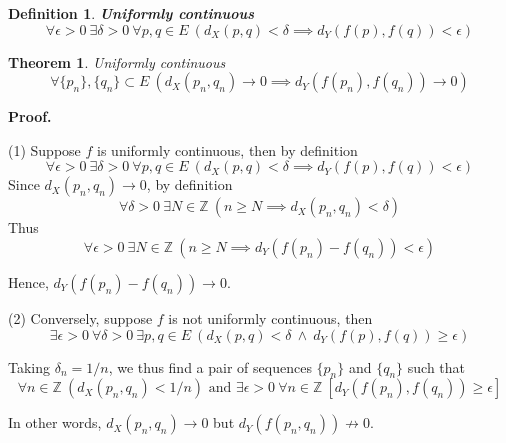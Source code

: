 \documentclass[aps,pra,onecolumn,notitlepage,superscriptaddress]{revtex4-1}
\newcommand{\Z}{\mathbb{Z}}
\newtheorem{theo}{Theorem}
\newtheorem{defi}{Definition}
\def\Proof{{\bf Proof.~}}
\begin{document}
    \begin{defi}
        \textbf{Uniformly continuous}
        \begin{equation}
            \forall \epsilon > 0 \ \exists \delta > 0 \ \forall p,q \in E \ \left(d_X(p,q) < \delta \implies d_Y(f(p),f(q)) < \epsilon \right)
        \end{equation}
    \end{defi}
    \begin{theo}
        Uniformly continuous
        \begin{equation}
            \forall \{p_n\}, \{q_n\} \subset E \ \left(d_X(p_n, q_n) \to 0 \implies d_Y(f(p_n), f(q_n)) \to 0 \right)
        \end{equation}
    \end{theo}
    \begin{framed}
        \Proof {
            
            (1) Suppose $f$ is uniformly continuous, then by definition
            \begin{equation}
                \forall \epsilon > 0 \ \exists \delta > 0 \ \forall p,q \in E \ \left(d_X(p,q) < \delta \implies d_Y(f(p),f(q)) < \epsilon \right)
            \end{equation}
            Since $d_X(p_n, q_n) \to 0$, by definition
            \begin{equation}
                \forall \delta > 0 \ \exists N \in \Z \ \left( n \geq N \implies d_X(p_n, q_n) < \delta \right)
            \end{equation}
            Thus
            \begin{equation}
                \forall \epsilon > 0 \ \exists N \in \Z \ \left( n \geq N \implies d_Y(f(p_n) - f(q_n)) < \epsilon \right)
            \end{equation}
    
            Hence, $d_Y(f(p_n) - f(q_n)) \to 0$.

            (2) Conversely, suppose $f$ is not uniformly continuous, then
            \begin{equation}
                \exists \epsilon > 0 \ \forall \delta > 0 \ \exists p,q\in E \ \left( d_X(p,q) < \delta \ \land \ d_Y(f(p),f(q)) \geq \epsilon \right) 
            \end{equation}
            
            Taking $\delta_n = 1/n$, we thus find a pair of sequences $\{p_n\}$ and $\{q_n\}$ such that
            \begin{equation}
                \forall n \in \Z \ (d_X(p_n, q_n) < 1/n) \text{ and } \exists \epsilon > 0 \ \forall n \in \Z \ [d_Y(f(p_n), f(q_n)) \geq \epsilon]
            \end{equation}

            In other words, $d_X(p_n, q_n) \to 0$ but $d_Y(f(p_n, q_n)) \not\to 0$.
        }
    \end{framed}
\end{document}
